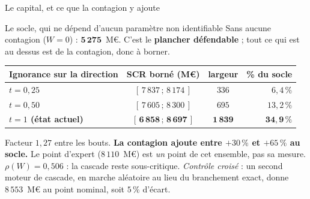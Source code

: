 \documentclass[11pt]{beamer}
\begin{document}
\begin{frame}{Le capital, et ce que la contagion y ajoute}
\small
\begin{block}{Le socle, qui ne dépend d'aucun paramètre non identifiable}
Sans aucune contagion ($W=0$) : $\mathbf{5\,275}$~M\euro. C'est le \textbf{plancher
défendable} ; tout ce qui est au dessus est de la contagion, donc à borner.
\end{block}
\begin{center}\footnotesize
\begin{tabular}{@{}l c c r@{}}
\toprule
\textbf{Ignorance sur la direction} & \textbf{SCR borné (M\euro)} & \textbf{largeur} &
\textbf{\% du socle} \\
\midrule
$t=0{,}25$ & $[\,7\,837\,;\,8\,174\,]$ & $336$ & $6{,}4\,\%$ \\
$t=0{,}50$ & $[\,7\,605\,;\,8\,300\,]$ & $695$ & $13{,}2\,\%$ \\
\textbf{$t=1$ (état actuel)} & $\mathbf{[\,6\,858\,;\,8\,697\,]}$ & $\mathbf{1\,839}$ &
$\mathbf{34{,}9\,\%}$ \\
\bottomrule
\end{tabular}
\end{center}
\vspace{1mm}
\footnotesize
Facteur $1{,}27$ entre les bouts. \textbf{La contagion ajoute entre $+30\,\%$ et $+65\,\%$
au socle.} Le point d'expert ($8\,110$~M\euro) est \emph{un} point de cet ensemble, pas sa
mesure. $\rho(W)=0{,}506$ : la cascade reste sous-critique. \emph{Contrôle croisé} : un
second moteur de cascade, en marche aléatoire au lieu du branchement exact, donne
$8\,553$~M\euro{} au point nominal, soit $5\,\%$ d'écart.
\end{frame}
\end{document}
